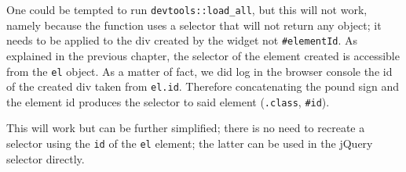 \documentclass[10pt,]{krantz}
\makeatletter
\newenvironment{Shaded}{\begin{snugshade}}{\end{snugshade}}
\newcommand{\AttributeTok}[1]{\textcolor[rgb]{0.61,0.61,0.61}{#1}}
\newcommand{\CommentTok}[1]{\textcolor[rgb]{0.37,0.37,0.37}{\textit{#1}}}
\newcommand{\DataTypeTok}[1]{\textcolor[rgb]{0.27,0.27,0.27}{#1}}
\newcommand{\KeywordTok}[1]{\textcolor[rgb]{0.27,0.27,0.27}{\textbf{#1}}}
\newcommand{\NormalTok}[1]{#1}
\newcommand{\OperatorTok}[1]{\textcolor[rgb]{0.43,0.43,0.43}{\textbf{#1}}}
\newcommand{\StringTok}[1]{\textcolor[rgb]{0.5,0.5,0.5}{#1}}
\newcommand{\VariableTok}[1]{\textcolor[rgb]{0,0,0}{#1}}
\newenvironment{kframe}{%
\medskip{}
\setlength{\fboxsep}{.8em}
 \def\at@end@of@kframe{}%
 \ifinner\ifhmode%
  \def\at@end@of@kframe{\end{minipage}}%
  \begin{minipage}{\columnwidth}%
 \fi\fi%
 \def\FrameCommand##1{\hskip\@totalleftmargin \hskip-\fboxsep
 \colorbox{shadecolor}{##1}\hskip-\fboxsep
     \hskip-\linewidth \hskip-\@totalleftmargin \hskip\columnwidth}%
 \MakeFramed {\advance\hsize-\width
   \@totalleftmargin\z@ \linewidth\hsize
   \@setminipage}}%
 {\par\unskip\endMakeFramed%
 \at@end@of@kframe}
\renewenvironment{Shaded}{\begin{kframe}}{\end{kframe}}
\makeatother
\begin{document}
\begin{Shaded}
\end{Shaded}

One could be tempted to run \texttt{devtools::load\_all}, but this will not work, namely because the function uses a selector that will not return any object; it needs to be applied to the div created by the widget not \texttt{\#elementId}. As explained in the previous chapter, the selector of the element created is accessible from the \texttt{el} object. As a matter of fact, we did log in the browser console the id of the created div taken from \texttt{el.id}. Therefore concatenating the pound sign and the element id produces the selector to said element (\texttt{.class}, \texttt{\#id}).

\begin{Shaded}
\end{Shaded}

This will work but can be further simplified; there is no need to recreate a selector using the \texttt{id} of the \texttt{el} element; the latter can be used in the jQuery selector directly.

\begin{Shaded}
\end{Shaded}
\end{document}
